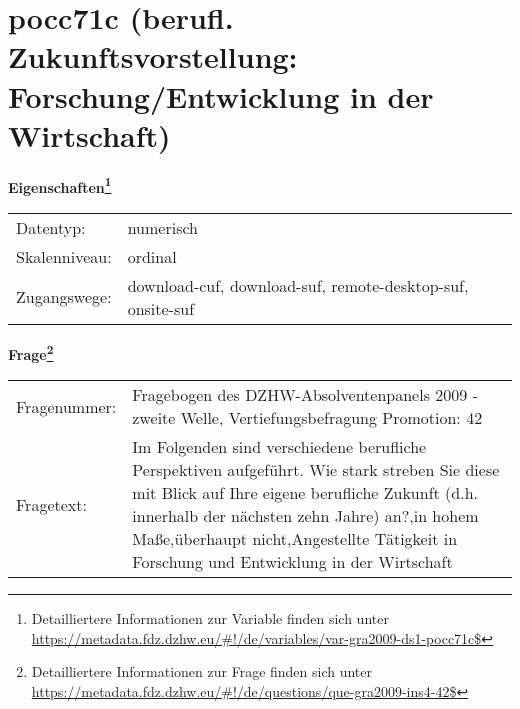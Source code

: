 
    \setcounter{footnote}{0}

    \vspace*{-1.8cm}
	\section{pocc71c (berufl. Zukunftsvorstellung: Forschung/Entwicklung in der Wirtschaft)}
	\label{section:pocc71c}



    \vspace*{0.5cm}
    \noindent\textbf{Eigenschaften\footnote{Detailliertere Informationen zur Variable finden sich unter
		\url{https://metadata.fdz.dzhw.eu/\#!/de/variables/var-gra2009-ds1-pocc71c$}}}\\
	\begin{tabularx}{\hsize}{@{}lX}
	Datentyp: & numerisch \\
	Skalenniveau: & ordinal \\
	Zugangswege: &
	  download-cuf, 
	  download-suf, 
	  remote-desktop-suf, 
	  onsite-suf
 \\
    \end{tabularx}



				\vspace*{0.5cm}
                \noindent\textbf{Frage\footnote{Detailliertere Informationen zur Frage finden sich unter
		              \url{https://metadata.fdz.dzhw.eu/\#!/de/questions/que-gra2009-ins4-42$}}}\\
				\begin{tabularx}{\hsize}{@{}lX}
					Fragenummer: &
					  Fragebogen des DZHW-Absolventenpanels 2009 - zweite Welle, Vertiefungsbefragung Promotion:
					  42
 \\
					Fragetext: & Im Folgenden sind verschiedene berufliche Perspektiven aufgeführt. Wie stark streben Sie diese mit Blick auf Ihre eigene berufliche Zukunft (d.h. innerhalb der nächsten zehn Jahre) an?,in hohem Maße,überhaupt nicht,Angestellte Tätigkeit in Forschung und Entwicklung in der Wirtschaft \\
				\end{tabularx}





